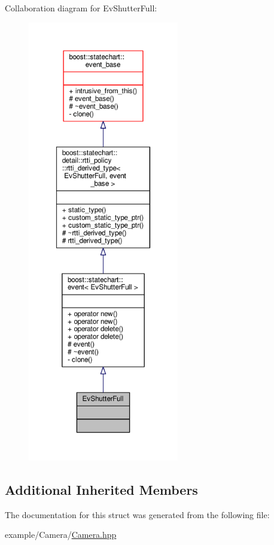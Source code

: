 Collaboration diagram for Ev\+Shutter\+Full\+:
\nopagebreak
\begin{figure}[H]
\begin{center}
\leavevmode
\includegraphics[height=550pt]{struct_ev_shutter_full__coll__graph}
\end{center}
\end{figure}
\subsection*{Additional Inherited Members}


The documentation for this struct was generated from the following file\+:\begin{DoxyCompactItemize}
\item 
example/\+Camera/\mbox{\hyperlink{_camera_8hpp}{Camera.\+hpp}}\end{DoxyCompactItemize}
